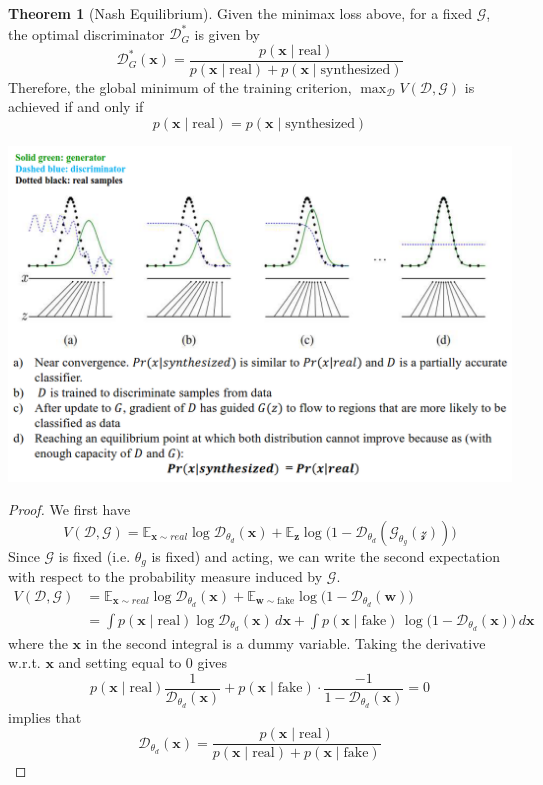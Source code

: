\documentclass{article}
\theoremstyle{definition}
\newtheorem{theorem}{Theorem}[section]
\theoremstyle{remark}
\theoremstyle{definition}
\begin{document}
  \begin{theorem}[Nash Equilibrium] 
  Given the minimax loss above, for a fixed $\mathcal{G}$, the optimal discriminator $\mathcal{D}_G^\ast$ is given by 
  \[\mathcal{D}_G^\ast (\mathbf{x}) = \frac{p(\mathbf{x} \mid \text{real})}{p(\mathbf{x} \mid \text{real}) + p(\mathbf{x} \mid \text{synthesized})}\]
  Therefore, the global minimum of the training criterion, $\max_{\mathcal{D}} V(\mathcal{D}, \mathcal{G})$ is achieved if and only if 
  \[p(\mathbf{x} \mid \text{real}) = p(\mathbf{x} \mid \text{synthesized})\]
  \begin{center}
      \includegraphics[scale=0.4]{Images/nash_equilibrium.png}
  \end{center}
  \end{theorem}
  \begin{proof} 
  We first have 
  \[V(\mathcal{D}, \mathcal{G}) = \mathbb{E}_{\mathbf{x} \sim real} \log \mathcal{D}_{\theta_d} (\mathbf{x}) + \mathbb{E}_{\mathbf{z}} \log \big( 1 - \mathcal{D}_{\theta_d} (\mathcal{G}_{\theta_g} (\mathcal{z}))\big) \]
  Since $\mathcal{G}$ is fixed (i.e. $\theta_g$ is fixed) and acting, we can write the second expectation with respect to the probability measure induced by $\mathcal{G}$.
  \begin{align*} 
  V(\mathcal{D}, \mathcal{G}) & = \mathbb{E}_{\mathbf{x} \sim real} \log \mathcal{D}_{\theta_d} (\mathbf{x}) + \mathbb{E}_{\mathbf{w} \sim \text{fake}} \log \big( 1 - \mathcal{D}_{\theta_d} (\mathbf{w}) \big) \\   
                                  & = \int p(\mathbf{x} \mid \text{real}) \log \mathcal{D}_{\theta_d}(\mathbf{x}) \,d\mathbf{x}+ \int p(\mathbf{x} \mid \text{fake}) \, \log \big( 1 - \mathcal{D}_{\theta_d} (\mathbf{x}) \big) \,d\mathbf{x} 
  \end{align*}
  where the $\mathbf{x}$ in the second integral is a dummy variable. Taking the derivative w.r.t. $\mathbf{x}$ and setting equal to $0$ gives 
  \[p(\mathbf{x} \mid \text{real}) \frac{1}{\mathcal{D}_{\theta_d} (\mathbf{x})} + p(\mathbf{x} \mid \text{fake}) \cdot \frac{-1}{1 - \mathcal{D}_{\theta_d}(\mathbf{x})} = 0\]
  implies that 
  \[\mathcal{D}_{\theta_d}( \mathbf{x}) = \frac{p(\mathbf{x} \mid \text{real})}{p(\mathbf{x} \mid \text{real}) + p(\mathbf{x} \mid \text{fake})}\]
  \end{proof} 
\end{document}
